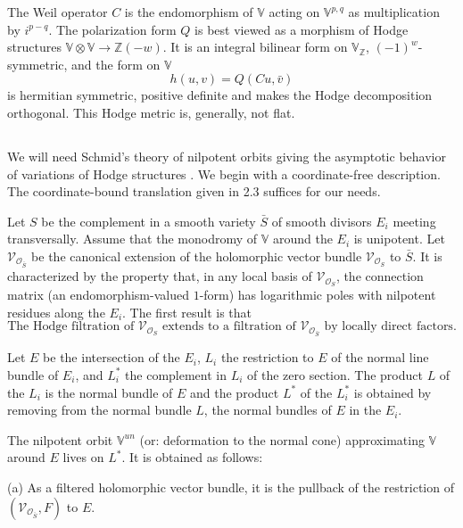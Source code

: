 \documentclass[11pt,a4paper]{article}
\theoremstyle{plain}
\theoremstyle{definition}
\begin{document}
The Weil operator $C$ is the endomorphism of $\mathbb{V}$ acting on $\mathbb{V}^{p,q}$ as multiplication by $i^{p-q}$. The polarization form $Q$ is best viewed as a morphism of Hodge structures $\mathbb{V}\otimes\mathbb{V}\to\mathbb{Z}(-w)$. It is an integral bilinear form on $\mathbb{V}_{\mathbb{Z}}$, $(-1)^w$-symmetric, and the form on $\mathbb{V}$
\[
h(u,v)=Q(Cu,\bar{v})
\]
is hermitian symmetric, positive definite and makes the Hodge decomposition orthogonal. This Hodge metric is, generally, not flat.

\subsection{}
We will need Schmid's theory of nilpotent orbits giving the asymptotic behavior of variations of Hodge structures \cite{schmid}. We begin with a coordinate-free description. The coordinate-bound translation given in 2.3 suffices for our needs.

Let $S$ be the complement in a smooth variety $\bar{S}$ of smooth divisors $E_i$ meeting transversally. Assume that the monodromy of $\mathbb{V}$ around the $E_i$ is unipotent. Let $\mathcal{V}_{\mathcal{O}_{\bar{S}}}$ be the canonical extension \cite{deligne-edpsr} of the holomorphic vector bundle $\mathcal{V}_{\mathcal{O}_S}$ to $\bar{S}$. It is characterized by the property that, in any local basis of $\mathcal{V}_{\mathcal{O}_S}$, the connection matrix (an endomorphism-valued $1$-form) has logarithmic poles with nilpotent residues along the $E_i$. The first result is that
\begin{equation}\label{eq:hodgeextends}
\text{The Hodge filtration of $\mathcal{V}_{\mathcal{O}_S}$ extends to a filtration of $\mathcal{V}_{\mathcal{O}_{\bar{S}}}$ by locally direct factors.}
\end{equation}

Let $E$ be the intersection of the $E_i$, $L_i$ the restriction to $E$ of the normal line bundle of $E_i$, and $L_i^*$ the complement in $L_i$ of the zero section. The product $L$ of the $L_i$ is the normal bundle of $E$ and the product $L^*$ of the $L_i^*$ is obtained by removing from the normal bundle $L$, the normal bundles of $E$ in the $E_i$.

The nilpotent orbit $\mathbb{V}^{un}$ (or: deformation to the normal cone) approximating $\mathbb{V}$ around $E$ lives on $L^*$. It is obtained as follows:

(a) As a filtered holomorphic vector bundle, it is the pullback of the restriction of $(\mathcal{V}_{\mathcal{O}_{\bar{S}}},F)$ to $E$.
\end{document}
